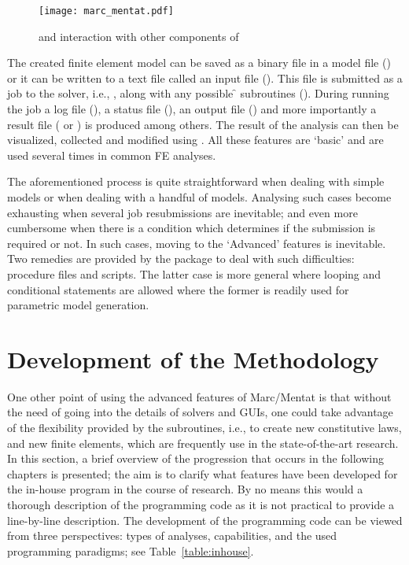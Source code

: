 	\begin{figure}[!h]
	\centering
	\texttt{[image: marc\_mentat.pdf]}
	\caption{\pym{} and \pyp{} interaction with other components of \mm{}}\label{figure:marc_mentat}
	\end{figure}

The created finite element model can be saved as a binary file in a model file () or it can be written to a text file called an input file (). This file is submitted as a job to the solver, i.e., \m{}, along with any possible \f{} subroutines (). %
During running the job a log file (), a status file (), an output file () and more importantly a result file ( or ) is produced among others. The result of the analysis can then be visualized, collected and modified using \M{}. All these features are `basic' and are used several times in common FE analyses.
 
The aforementioned process is quite straightforward when dealing with simple models or when dealing with a handful of models. Analysing such cases become exhausting when several job resubmissions are inevitable; and even more cumbersome when there is a condition which determines if the submission is required or not. In such cases, moving to the `Advanced' features is inevitable. Two remedies are provided by the package to deal with such difficulties: procedure files and \py{} scripts. The latter case is more general where looping and conditional statements are allowed where the former is readily used for parametric model generation.


\section{Development of the Methodology}
	One other point of using the advanced features of Marc/Mentat is that without the need of going into the details of solvers and GUIs, one could take advantage of the flexibility provided by the subroutines, i.e., to create new constitutive laws, and new finite elements, which are frequently use in the state-of-the-art research. In this section, a brief overview of the progression that occurs in the following chapters is presented; the aim is to clarify what features have been developed for the in-house program in the course of research. By no means this would a thorough description of the programming code as it is not practical to provide a line-by-line description. The development of the programming code can be viewed from three perspectives: types of analyses, capabilities, and the used programming paradigms; see Table~\ref{table:inhouse}.


